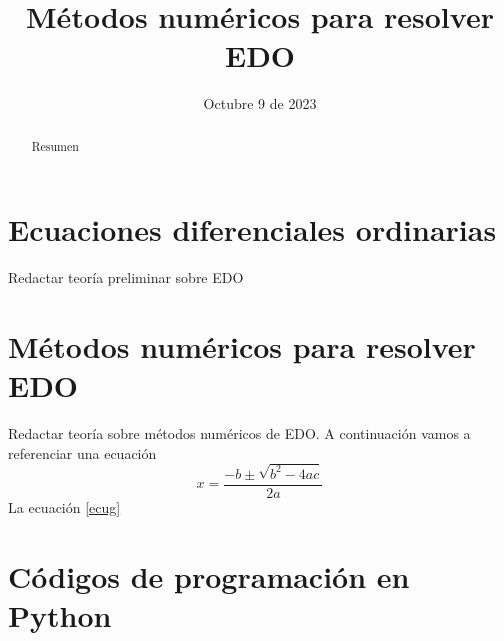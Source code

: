 \documentclass[12pt,letterpaper]{article}
\title{Métodos numéricos para resolver EDO}
\date{Octubre 9 de 2023}
\begin{document}
\maketitle
\begin{abstract}
 Resumen   
\end{abstract}

\section{Ecuaciones diferenciales ordinarias}
Redactar teoría preliminar sobre EDO \cite[pp. 43]{librozill}

\section{Métodos numéricos para resolver EDO}
Redactar teoría sobre métodos numéricos de EDO.  A continuación vamos a referenciar una ecuación
\begin{equation}\label{ecug}
    x=\frac{-b\pm\sqrt{b^2-4ac}}{2a}
\end{equation}
La ecuación \eqref{ecug}
\section{Códigos de programación en Python}



\end{document}
